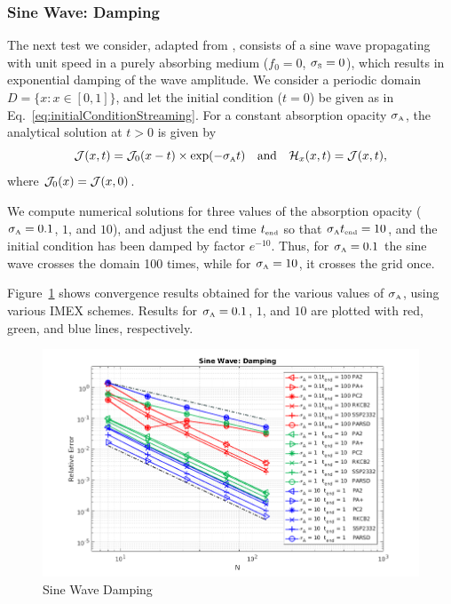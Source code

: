 \subsubsection{Sine Wave: Damping}

The next test we consider, adapted from \cite{skinnerOstriker_2013}, consists of a sine wave propagating with unit speed in a purely absorbing medium ($f_{0}=0$, $\sigma_{\mbox{\tiny S}}=0$), which results in exponential damping of the wave amplitude.  
We consider a periodic domain $D=\{x:x\in[0,1]\}$, and let the initial condition ($t=0$) be given as in Eq.~\eqref{eq:initialConditionStreaming}.  
For a constant absorption opacity $\sigma_{\mbox{\tiny A}}$, the analytical solution at $t>0$ is given by
\begin{equation}
  \mathcal{J}(x,t)=\mathcal{J}_{0}(x-t)\times\exp(-\sigma_{\mbox{\tiny A}} t)
  \quad\text{and}\quad
  \mathcal{H}_{x}(x,t)=\mathcal{J}(x,t),
\end{equation}
where $\mathcal{J}_{0}(x)=\mathcal{J}(x,0)$.  

We compute numerical solutions for three values of the absorption opacity ($\sigma_{\mbox{\tiny A}}=0.1$, $1$, and $10$), and adjust the end time $t_{\mbox{\tiny end}}$ so that $\sigma_{\mbox{\tiny A}}t_{\mbox{\tiny end}}=10$, and the initial condition has been damped by factor $e^{-10}$.  
Thus, for $\sigma_{\mbox{\tiny A}}=0.1$ the sine wave crosses the domain 100 times, while for $\sigma_{\mbox{\tiny A}}=10$, it crosses the grid once.  

Figure~\ref{fig:SineWaveDamping} shows convergence results obtained for the various values of $\sigma_{\mbox{\tiny A}}$, using various IMEX schemes.  
Results for $\sigma_{\mbox{\tiny A}}=0.1$, $1$, and $10$ are plotted with red, green, and blue lines, respectively.  

\begin{figure}[h]
  \centering
    \includegraphics[width=\textwidth]{figures/SineWaveDamping}
   \caption{Sine Wave Damping}
  \label{fig:SineWaveDamping}
\end{figure}


